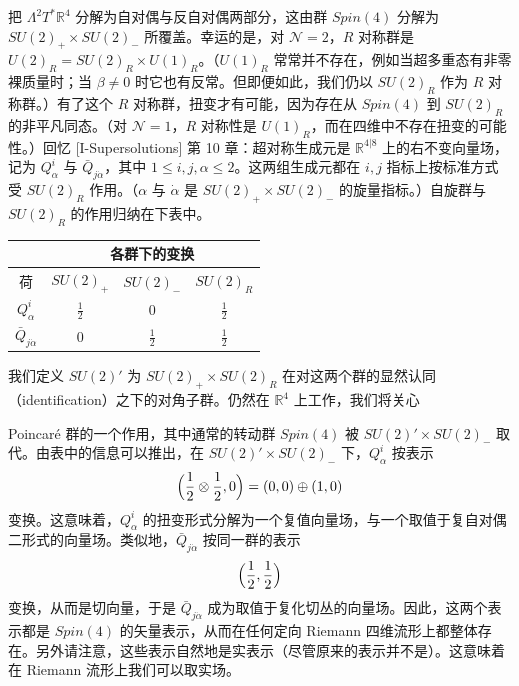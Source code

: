把 $\Lambda^2T^*\mathbb{R}^4$ 分解为自对偶与反自对偶两部分，这由群 $Spin(4)$ 分解为 $SU(2)_+\times SU(2)_-$ 所覆盖。幸运的是，对 $\mathcal{N}=2$，$R$ 对称群是 $U(2)_R=SU(2)_R\times U(1)_R$。（$U(1)_R$ 常常并不存在，例如当超多重态有非零裸质量时；当 $\beta\ne0$ 时它也有反常。但即便如此，我们仍以 $SU(2)_R$ 作为 $R$ 对称群。）有了这个 $R$ 对称群，扭变才有可能，因为存在从 $Spin(4)$ 到 $SU(2)_R$ 的非平凡同态。（对 $\mathcal{N}=1$，$R$ 对称性是 $U(1)_R$，而在四维中不存在扭变的可能性。）回忆 [I-Supersolutions] 第 10 章：超对称生成元是 $\mathbb{R}^{4|8}$ 上的右不变向量场，记为 $Q^i_\alpha$ 与 $\bar Q_{j\dot\alpha}$，其中 $1\le i,j,\alpha\le2$。这两组生成元都在 $i,j$ 指标上按标准方式受 $SU(2)_R$ 作用。（$\alpha$ 与 $\dot\alpha$ 是 $SU(2)_+\times SU(2)_-$ 的旋量指标。）自旋群与 $SU(2)_R$ 的作用归纳在下表中。

\begin{center}
\begin{tabular}{|c||c|c|c|}
\hline
\multicolumn{1}{|c||}{} & \multicolumn{3}{c|}{各群下的变换}\\
\hline
\multicolumn{1}{|c||}{荷} & $SU(2)_+$ & $SU(2)_-$ & $SU(2)_R$\\
\hline
$Q^i_\alpha$ & $\frac12$ & $0$ & $\frac12$\\
\hline
$\bar Q_{j\dot\alpha}$ & $0$ & $\frac12$ & $\frac12$\\
\hline
\end{tabular}
\end{center}


我们定义 $SU(2)'$ 为 $SU(2)_+\times SU(2)_R$ 在对这两个群的显然认同（identification）之下的对角子群。仍然在 $\mathbb{R}^4$ 上工作，我们将关心

Poincaré 群的一个作用，其中通常的转动群 $Spin(4)$ 被 $SU(2)'\times SU(2)_-$ 取代。由表中的信息可以推出，在 $SU(2)'\times SU(2)_-$ 下，$Q^i_\alpha$ 按表示
\[
\Bigl(\frac12\otimes\frac12,0\Bigr)=(0,0)\oplus(1,0)
\]
变换。这意味着，$Q^i_\alpha$ 的扭变形式分解为一个复值向量场，与一个取值于复自对偶二形式的向量场。类似地，$\bar Q_{j\dot\alpha}$ 按同一群的表示
\[
\Bigl(\frac12,\frac12\Bigr)
\]
变换，从而是切向量，于是 $\bar Q_{j\dot\alpha}$ 成为取值于复化切丛的向量场。因此，这两个表示都是 $Spin(4)$ 的矢量表示，从而在任何定向 Riemann 四维流形上都整体存在。另外请注意，这些表示自然地是实表示（尽管原来的表示并不是）。这意味着在 Riemann 流形上我们可以取实场。

